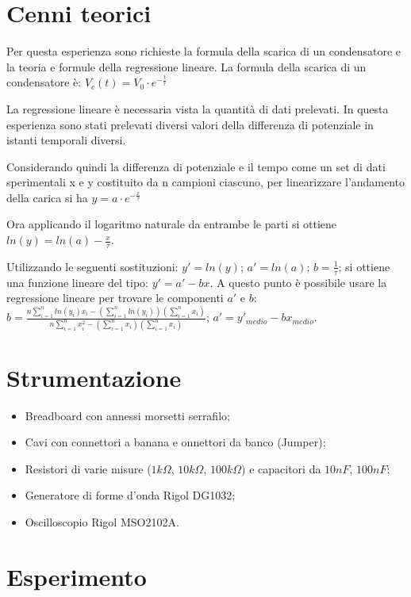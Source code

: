     \section{Cenni teorici}
    Per questa esperienza sono richieste la formula della scarica di un condensatore e la teoria e formule della regressione lineare.
    La formula della scarica di un condensatore è:
    $V_c(t)=V_0 \cdot e^{-\frac{t}{\tau}}$ \par
    La regressione lineare è necessaria vista la quantità di dati prelevati.
     In questa esperienza sono stati prelevati diversi valori della differenza di potenziale in istanti temporali diversi.\par
    Considerando quindi la differenza di potenziale e il tempo come un set di dati sperimentali x e y costituito da n campioni ciascuno, 
    per linearizzare l’andamento della carica si ha $y=a \cdot e^{-\frac{x}{\tau}}$ \par
    Ora applicando il logaritmo naturale da entrambe le parti si ottiene $ln(y)=ln(a)-{\frac{x}{\tau}}$. \par
    Utilizzando le seguenti sostituzioni: 
    $y'=ln(y)$; 
    $a'=ln(a)$; 
    $b=\frac{1}{\tau}$; 
    si ottiene una funzione lineare del tipo: $y'=a'-bx$.
    A questo punto è possibile usare la regressione lineare per trovare le componenti $a'$ e $b$: 
    $b=\frac{n\sum_{i = 1}^{n} ln(y_i)x_i - (\sum_{i = 1}^{n} ln(y_i))(\sum_{i = 1}^{n} x_i) }{n\sum_{i = 1}^{n} x_i^2 - (\sum_{i = 1}^{n} x_i)(\sum_{i = 1}^{n} x_i)}$; 
    $a'=y'_{medio}-bx_{medio}$. \par


    \section{Strumentazione}
    \begin{itemize}
        \item Breadboard con annessi morsetti serrafilo;
        \item Cavi con connettori a banana e onnettori da banco (Jumper);
        \item Resistori di varie misure ($1k\Omega$, $10k\Omega$, $100k\Omega$) e capacitori da $10nF$, $100nF$;
        \item Generatore di forme d'onda Rigol DG1032;
        \item Oscilloscopio Rigol MSO2102A.
    \end{itemize}

    \section{Esperimento}
    
